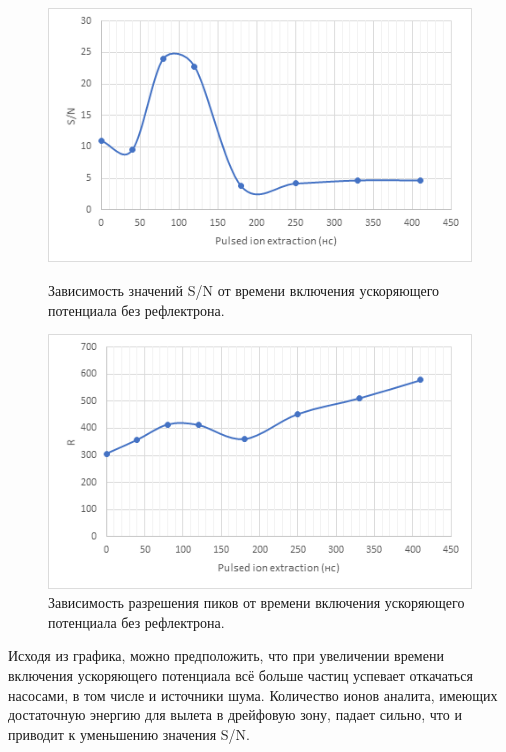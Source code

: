 \documentclass[12pt]{article}
\begin{document}
\begin{flushleft}
\begin{figure}[!h]
\begin{center}
\begin{minipage}[h]{0.4\linewidth}
\includegraphics[width=1.2\linewidth]{7}
\caption{Зависимость значений S/N от времени включения ускоряющего потенциала без рефлектрона.} %
\label{ris:experimoriginal} %
\end{minipage}
\hfill 
\begin{minipage}[h]{0.4\linewidth}
\includegraphics[width=1.2\linewidth]{8}
\caption{Зависимость разрешения пиков от времени включения ускоряющего потенциала без рефлектрона.}
\label{ris:experimcoded}
\end{minipage}
\end{center}
\end{figure}

Исходя из графика, можно предположить, что при увеличении
времени включения ускоряющего потенциала всё больше частиц успевает
откачаться насосами, в том числе и источники шума. Количество
ионов аналита, имеющих достаточную энергию для вылета в дрейфовую
зону, падает сильно, что и приводит к уменьшению значения S/N.

\end{flushleft}
\end{document}

